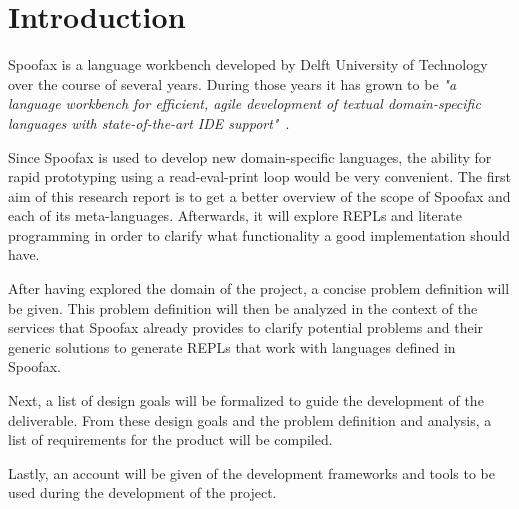 \section*{Introduction}
\label{sec:introduction}

Spoofax is a language workbench developed by Delft University of Technology over
the course of several years. During those years it has grown to be \textit{"a
language workbench for efficient, agile development of textual domain-specific
languages with state-of-the-art IDE support"}~\cite{Kats10a}.

Since Spoofax is used to develop new domain-specific languages, the ability for
rapid prototyping using a read-eval-print loop would be very convenient.  The
first aim of this research report is to get a better overview of the scope of
Spoofax and each of its meta-languages. Afterwards, it will explore REPLs and
literate programming in order to clarify what functionality a good
implementation should have.

After having explored the domain of the project, a concise problem definition
will be given. This problem definition will then be analyzed in the context of
the services that Spoofax already provides to clarify potential problems and
their generic solutions to generate REPLs that work with languages defined in
Spoofax.

Next, a list of design goals will be formalized to guide the development of the
deliverable. From these design goals and the problem definition and analysis, a
list of requirements for the product will be compiled.

Lastly, an account will be given of the development frameworks and tools to be
used during the development of the project.


